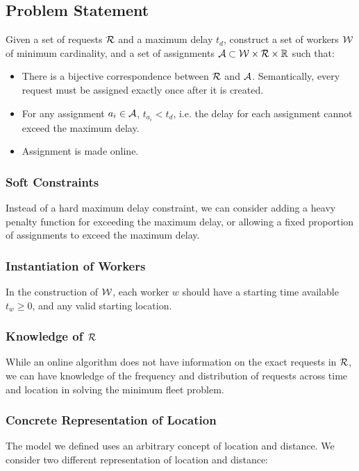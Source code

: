 \documentclass[urop]{socreport}
\begin{document}
\subsection{Problem Statement}
Given a set of requests $\mathcal{R}$ and a maximum delay $t_d$, construct a set of workers $\mathcal{W}$ of minimum cardinality, and a set of assignments $\mathcal{A} \subset \mathcal{W} \times \mathcal{R} \times \mathbb{R}$ such that:
\begin{itemize}
    \item There is a bijective correspondence between $\mathcal{R}$ and $\mathcal{A}$. Semantically, every request must be assigned exactly once after it is created.
    \item For any assignment $a_i \in \mathcal{A}$, $t_{a_i} < t_d$, i.e. the delay for each assignment cannot exceed the maximum delay.
    \item Assignment is made online.
\end{itemize}

\subsubsection{Soft Constraints}
Instead of a hard maximum delay constraint, we can consider adding a heavy penalty function for exceeding the maximum delay, or allowing a fixed proportion of assignments to exceed the maximum delay.

\subsubsection{Instantiation of Workers}
In the construction of $\mathcal{W}$, each worker $w$ should have a starting time available $t_w \geq 0$, and any valid starting location.

\subsubsection{Knowledge of $\mathcal{R}$}
While an online algorithm does not have information on the exact requests in $\mathcal{R}$, we can have knowledge of the frequency and distribution of requests across time and location in solving the minimum fleet problem.

\subsubsection{Concrete Representation of Location}
The model we defined uses an arbitrary concept of location and distance. We consider two different representation of location and distance:
\end{document}
